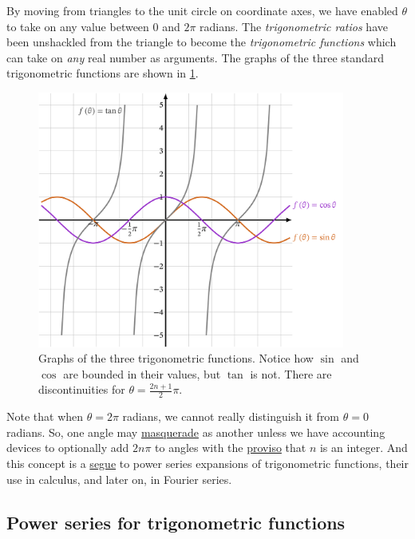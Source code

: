 \documentclass[
  a4paper,
]{article}
\begin{document}
By moving from triangles to the unit circle on coordinate axes, we have
enabled \(\theta\) to take on any value between 0 and \(2\pi\) radians.
The \emph{trigonometric ratios} have been unshackled from the triangle
to become the \emph{trigonometric functions} which can take on
\emph{any} real number as arguments. The graphs of the three standard
trigonometric functions are shown in \cref{fig:threegraph}.

\begin{figure}
\hypertarget{fig:threegraph}{%
\centering
\includegraphics[width=0.9\textwidth,height=\textheight]{images/threegraph.png}
\caption{Graphs of the three trigonometric functions. Notice how
\(\sin\) and \(\cos\) are bounded in their values, but \(\tan\) is not.
There are discontinuities for
\(\theta=\frac{2n+1}{2}\pi\).}\label{fig:threegraph}
}
\end{figure}

Note that when \(\theta = 2\pi\) radians, we cannot really distinguish
it from \(\theta=0\) radians. So, one angle may
\href{https://www.thefreedictionary.com/masquerade}{masquerade} as
another unless we have accounting devices to optionally add \(2n\pi\) to
angles with the
\href{https://dictionary.cambridge.org/dictionary/english/proviso}{proviso}
that \(n\) is an integer. And this concept is a
\href{https://www.dictionary.com/browse/segue}{segue} to power series
expansions of trigonometric functions, their use in calculus, and later
on, in Fourier series.

\hypertarget{power-series-for-trigonometric-functions}{%
\subsection{Power series for trigonometric
functions}\label{power-series-for-trigonometric-functions}}
\end{document}
